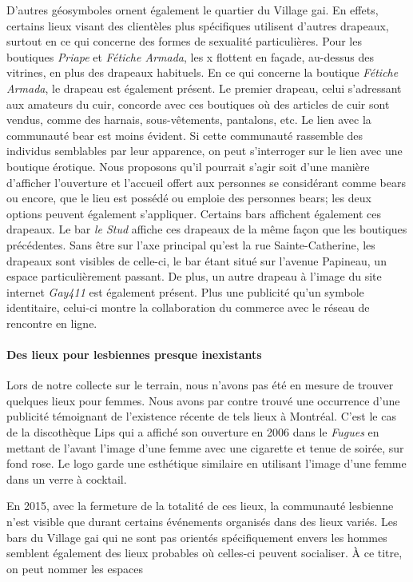 D'autres géosymboles \lgbt{} ornent également le quartier du Village gai.
En effets, certains lieux visant des clientèles plus spécifiques utilisent d'autres drapeaux, surtout en ce qui concerne des formes de sexualité particulières.
Pour les boutiques \emph{Priape} et \emph{Fétiche Armada}, les x  flottent en façade, au-dessus des vitrines, en plus des drapeaux  habituels.
En ce qui concerne la boutique \emph{Fétiche Armada}, le drapeau  est également présent.
Le premier drapeau, celui s'adressant aux amateurs du cuir, concorde avec ces boutiques où des articles de cuir sont vendus, comme des harnais, sous-vêtements, pantalons, etc.
Le lien avec la communauté bear est moins évident.
Si cette communauté rassemble des individus semblables par leur apparence, on peut s'interroger sur le lien avec une boutique érotique.
Nous proposons qu'il pourrait s'agir soit d'une manière d'afficher l'ouverture et l'accueil offert aux personnes se considérant comme bears ou encore, que le lieu est possédé ou emploie des personnes bears; les deux options peuvent également s'appliquer.
Certains bars affichent également ces drapeaux.
Le bar \emph{le Stud} affiche ces drapeaux de la même façon que les boutiques précédentes.
Sans être sur l'axe principal qu'est la rue Sainte-Catherine, les drapeaux sont visibles de celle-ci, le bar étant situé sur l'avenue Papineau, un espace particulièrement passant.
De plus, un autre drapeau à l'image du site internet \emph{Gay411} est également présent.
Plus une publicité qu'un symbole identitaire, celui-ci montre la collaboration du commerce avec le réseau de rencontre en ligne.

\paragraph{Des lieux pour lesbiennes presque inexistants}
Lors de notre collecte sur le terrain, nous n'avons pas été en mesure de trouver quelques lieux pour femmes.
Nous avons par contre trouvé une occurrence d'une publicité témoignant de l'existence récente de tels lieux à Montréal.
C'est le cas de la discothèque Lips qui a affiché son ouverture en 2006 dans le \emph{Fugues} en mettant de l'avant l'image d'une femme avec une cigarette et tenue de soirée, sur fond rose.
Le logo garde une esthétique similaire en utilisant l'image d'une femme dans un verre à cocktail.

En 2015, avec la fermeture de la totalité de ces lieux, la communauté lesbienne n'est visible que durant certains événements organisés dans des lieux variés.
Les bars du Village gai qui ne sont pas orientés spécifiquement envers les hommes semblent également des lieux probables où celles-ci peuvent socialiser.
À ce titre, on peut nommer les espaces 

